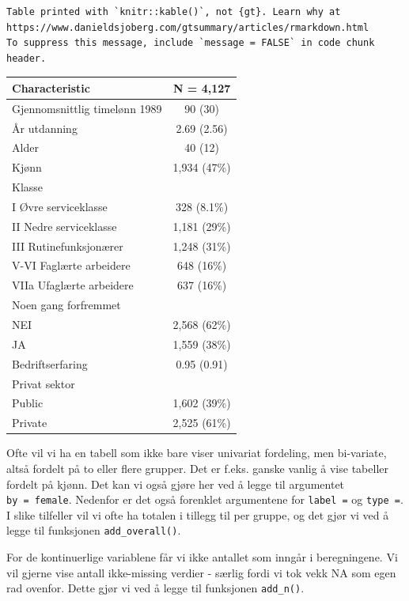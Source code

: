 \documentclass[
  letterpaper,
  DIV=11,
  numbers=noendperiod]{scrreprt}
\theoremstyle{definition}
\theoremstyle{remark}
\begin{document}
\begin{verbatim}
Table printed with `knitr::kable()`, not {gt}. Learn why at
https://www.danieldsjoberg.com/gtsummary/articles/rmarkdown.html
To suppress this message, include `message = FALSE` in code chunk header.
\end{verbatim}

\begin{longtable}[]{@{}lc@{}}
\toprule()
\textbf{Characteristic} & \textbf{N = 4,127} \\
\midrule()
\endhead
Gjennomsnittlig timelønn 1989 & 90 (30) \\
År utdanning & 2.69 (2.56) \\
Alder & 40 (12) \\
Kjønn & 1,934 (47\%) \\
Klasse & \\
I Øvre serviceklasse & 328 (8.1\%) \\
II Nedre serviceklasse & 1,181 (29\%) \\
III Rutinefunksjonærer & 1,248 (31\%) \\
V-VI Faglærte arbeidere & 648 (16\%) \\
VIIa Ufaglærte arbeidere & 637 (16\%) \\
Noen gang forfremmet & \\
NEI & 2,568 (62\%) \\
JA & 1,559 (38\%) \\
Bedriftserfaring & 0.95 (0.91) \\
Privat sektor & \\
Public & 1,602 (39\%) \\
Private & 2,525 (61\%) \\
\bottomrule()
\end{longtable}

Ofte vil vi ha en tabell som ikke bare viser univariat fordeling, men
bi-variate, altså fordelt på to eller flere grupper. Det er f.eks.
ganske vanlig å vise tabeller fordelt på kjønn. Det kan vi også gjøre
her ved å legge til argumentet \texttt{by\ =\ female}. Nedenfor er det
også forenklet argumentene for \texttt{label\ =} og \texttt{type\ =}. I
slike tilfeller vil vi ofte ha totalen i tillegg til per gruppe, og det
gjør vi ved å legge til funksjonen \texttt{add\_overall()}.

For de kontinuerlige variablene får vi ikke antallet som inngår i
beregningene. Vi vil gjerne vise antall ikke-missing verdier - særlig
fordi vi tok vekk NA som egen rad ovenfor. Dette gjør vi ved å legge til
funksjonen \texttt{add\_n()}.
\end{document}
